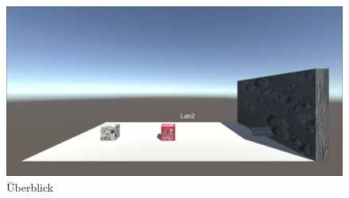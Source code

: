 \documentclass[../main.tex]{subfiles}
\begin{document}
    \begin{figure}[h]
        \begin{center}
            \centerline{\includegraphics[width=150mm]{./images/2Lab_ExperimentOverview.png}}
            \caption{Überblick}
            \label{Overview 3d}
        \end{center}
    \end{figure}
\end{document}
